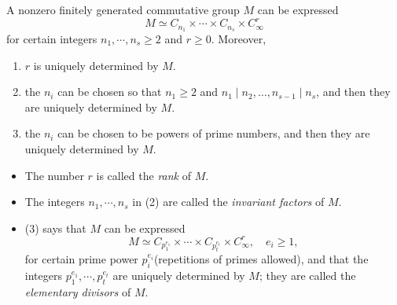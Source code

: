 \begin{theorem}
  A nonzero finitely generated commutative group \( M \) can be expressed
  \[
    M \simeq C_{n_1} \times \cdots \times C_{n_s} \times C^r_\infty
  \]
  for certain integers \( n_1, \cdots, n_s \geq 2 \) and \( r \geq 0 \).
  Moreover,
  \begin{enumerate}
    \item \( r \) is uniquely determined by \( M \).
    \item the \( n_i \) can be chosen so that \( n_1 \geq 2 \) and \( n_1 \mid
      n_2, \ldots, n_{s - 1} \mid n_s \), and then they are uniquely determined
      by \( M \).
    \item the \( n_i \) can be chosen to be powers of prime numbers, and then
      they are uniquely determined by \( M \).
  \end{enumerate}
\end{theorem}
\begin{remark}
  \begin{itemize}
    \item The number \( r \) is called the \emph{rank} of \( M \).
    \item The integers \( n_1, \cdots, n_s \) in (2) are called the
      \emph{invariant factors} of \( M \).
    \item (3) says that \( M \) can be expressed
      \begin{equation}
        M \simeq C_{p^{e_1}_1} \times \cdots \times C_{p^{e_t}_t} \times
        C^r_\infty,\quad e_i \geq 1,\tag{*}\label{eq: elementary decomposition}
      \end{equation}
      for certain prime power \( p^{e_i}_i \)(repetitions of primes allowed),
      and that the integers \( p^{e_1}_{1}, \cdots, p^{e_t}_t \) are uniquely
      determined by \( M \); they are called the \emph{elementary divisors} of
      \( M \).
  \end{itemize}
\end{remark}
